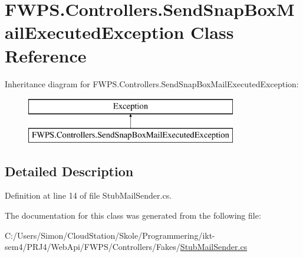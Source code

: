 \hypertarget{class_f_w_p_s_1_1_controllers_1_1_send_snap_box_mail_executed_exception}{}\section{F\+W\+P\+S.\+Controllers.\+Send\+Snap\+Box\+Mail\+Executed\+Exception Class Reference}
\label{class_f_w_p_s_1_1_controllers_1_1_send_snap_box_mail_executed_exception}
Inheritance diagram for F\+W\+P\+S.\+Controllers.\+Send\+Snap\+Box\+Mail\+Executed\+Exception\+:\begin{figure}[H]
\begin{center}
\leavevmode
\includegraphics[height=2.000000cm]{class_f_w_p_s_1_1_controllers_1_1_send_snap_box_mail_executed_exception}
\end{center}
\end{figure}


\subsection{Detailed Description}


Definition at line 14 of file Stub\+Mail\+Sender.\+cs.



The documentation for this class was generated from the following file\+:\begin{DoxyCompactItemize}
\item 
C\+:/\+Users/\+Simon/\+Cloud\+Station/\+Skole/\+Programmering/ikt-\/sem4/\+P\+R\+J4/\+Web\+Api/\+F\+W\+P\+S/\+Controllers/\+Fakes/\mbox{\hyperlink{_stub_mail_sender_8cs}{Stub\+Mail\+Sender.\+cs}}\end{DoxyCompactItemize}
